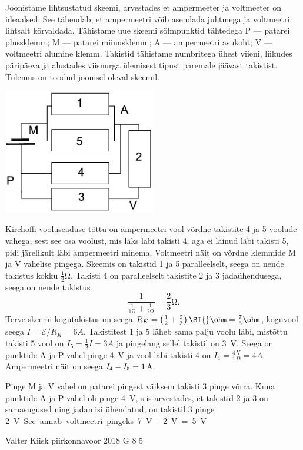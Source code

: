 \documentclass[11pt, twoside]{article}
\begin{document}
{{\ifSolution
Joonistame lihtsustatud skeemi, arvestades et ampermeeter ja voltmeeter 
on ideaalsed. See tähendab, et ampermeetri võib asendada juhtmega ja 
voltmeetri lihtsalt kõrvaldada. Tähistame uue skeemi sõlmpunktid 
tähtedega P --- patarei plussklemm; M --- patarei miinusklemm; A --- 
ampermeetri asukoht; V --- voltmeetri alumine klemm. Takistid tähistame 
numbritega ühest viieni, liikudes päripäeva ja alustades viisnurga 
ülemisest tipust paremale jäävast takistist. Tulemus on toodud joonisel 
oleval skeemil.
\begin{center}
	\includegraphics[width=0.5\textwidth]{2017-v3g-06-viisnurk-lah}
\end{center}
Kirchoffi vooluseaduse tõttu on ampermeetri vool võrdne 
takistite 4 ja 5 voolude vahega, sest see osa voolust, mis läks läbi takisti 4, aga ei läinud läbi takisti 5, pidi järelikult läbi ampermeetri minema. Voltmeetri näit on võrdne klemmide 
M ja V vahelise pingega.
Skeemis on takistid 1 ja 5 paralleelselt, seega on nende takistus kokku $\frac12 \si{\ohm}$. Takisti 4 on paralleelselt 
takistite 2 ja 3 jadaühendusega, seega on nende takistus
$$\frac{1}{\frac{1}{1\si{\ohm}}+\frac{1}{2\si{\ohm}}} = \frac 23 \si{\ohm}. $$
Terve skeemi kogutakistus on seega $R_K=\left(\frac 12 + 
\frac 23\right)\SI{}\ohm=\frac 76\ohm$, koguvool seega $I=\mathcal 
E/R_K=\SI{6}A$. Takistitest 1 ja 5 läheb sama palju voolu läbi,
mistõttu takisti 5 vool on $I_5=\frac 12 I=\SI{3}A$ ja pingelang sellel takistil on \SI{3}{\volt}. Seega on punktide A ja P vahel pinge \SI{4}{\volt} ja vool läbi takisti 4 
on $I_4=\frac{\SI{4}{\volt}}{\SI{1}{\ohm}}=\SI{4}A$. Ampermeetri
näit on seega $I_4-I_5=\SI 1A$.

Pinge M ja V vahel on patarei pingest väiksem takisti 3 pinge võrra. Kuna punktide A ja P vahel oli pinge \SI{4}{\volt}, siis arvestades, et takistid 2 ja 3 on samasugused ning jadamisi ühendatud, on takistil 3 pinge \SI{2}V. 
See annab voltmeetri pingeks
\SI{7}V -\SI{2}V= \SI{5}V.
\fi
}

{Valter Kiisk} %
{piirkonnavoor} %
{2018} %
{G 8} %
{5} %
{

}}
\end{document}
